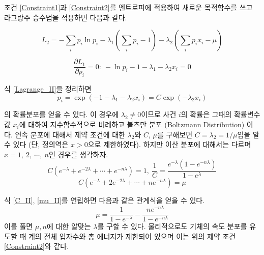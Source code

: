 조건 \ref{Constraint1}과 \ref{Constraint2}를 엔트로피에 적용하여 새로운 목적함수를 쓰고 라그랑주 승수법을 적용하면 다음과 같다.

\begin{equation}
    L_{2} = -\sum_{i} p_{i} \ln{p_{i}} - \lambda_{1} ( \sum_{i} p_{i} - 1) - \lambda_{2} (\sum_{i} p_{i}x_{i} - \mu)
    \label{L_II}
\end{equation}

\begin{equation}
    \frac{\partial L_{1}}{\partial p_{i}} = 0:~ -\ln{p_{i}} - 1 - \lambda_{1} - \lambda_{2} x_{i} = 0
    \label{Lagrange_II}
\end{equation}

식 \ref{Lagrange_II}을 정리하면
\begin{equation}
    p_{i} = \exp{(-1-\lambda_{1} - \lambda_{2} x_{i})} = C \exp{(-\lambda_{2} x_{i})}
    \label{p_i(Lagrange_II)}
\end{equation}

의 확률분포를 얻을 수 있다. 이 경우에 $\lambda_{2} \neq 0$이므로 사건 $i$의 확률은 그때의 확률변수 값 $x_{i}$에 대하여 지수함수적으로 비례하고 볼츠만 분포 (Boltzmann Distribution) 이다. 연속 분포에 대해서 제약 조건에 대한 $\lambda_{2}$와 $C$, $\mu$를 구해보면 $C = \lambda_{2} = 1/\mu$임을 알 수 있다 (단, 정의역은 $x>0$으로 제한하였다). 하지만 이산 분포에 대해서는 다르며 $x=1, ~2, ~\cdots, ~n$인 경우를 생각하자.
\begin{equation}
    C(e^{-\lambda}+e^{-2\lambda} + \cdots + e^{-n\lambda}) = 1, ~ \frac{1}{C} = \frac{e^{-\lambda}(1-e^{-n\lambda})}{1-e^{\lambda}}
    \label{C_II}
\end{equation}
\begin{equation}
    C(e^{-\lambda}+2e^{-2\lambda} + \cdots + ne^{-n\lambda}) = \mu
    \label{mu_II}
\end{equation}

식 \ref{C_II}, \ref{mu_II}를 연립하면 다음과 같은 관계식을 얻을 수 있다.
\begin{equation}
    \mu = \frac{1}{1-e^{-\lambda}} - \frac{ne^{-n\lambda}}{1-e^{-n\lambda}}
    \label{mu, n, lambda relation_II}
\end{equation}
이를 풀면 $\mu, n$에 대한 알맞는 $\lambda$를 구할 수 있다. 물리적으로도 기체의 속도 분포를 유도할 때 계의 전체 입자수와 총 에너지가 제한되어 있으며 이는 위의 제약 조건 \ref{Constraint2}와 같다.


